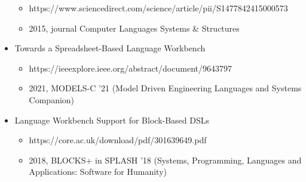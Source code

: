 \begin{itemize}
      \begin{itemize}
        \item https://www.sciencedirect.com/science/article/pii/S1477842415000573
        \item 2015, journal Computer Languages Systems \& Structures
      \end{itemize}
      \item Towards a Spreadsheet-Based Language Workbench
      \begin{itemize}
        \item https://ieeexplore.ieee.org/abstract/document/9643797
        \item 2021, MODELS-C '21 (Model Driven Engineering Languages and Systems Companion)
      \end{itemize}
      \item Language Workbench Support for Block-Based DSLs
      \begin{itemize}
        \item https://core.ac.uk/download/pdf/301639649.pdf
        \item 2018, BLOCKS+ in SPLASH '18 (Systems, Programming, Languages and Applications: Software for Humanity)
      \end{itemize}
    \end{itemize}